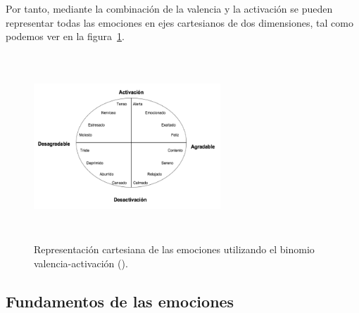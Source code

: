 Por tanto, mediante la combinación de la valencia y la activación se pueden representar todas las emociones en ejes cartesianos de dos dimensiones, tal como podemos ver en la figura~\ref{fig:valAct2}.

\begin{figure}[h]
    \centering
    \includegraphics[width=7cm, height=7cm]{Imagenes/valAct2}
    \caption[Representación cartesiana de las emociones utilizando el binomio valencia-activación extraída del texto de Hernández (\citeyear{hernandez2016clasificacion}).]{Representación cartesiana de las emociones utilizando el binomio valencia-activación (\citep{hernandez2016clasificacion}).}
    \label{fig:valAct2}
\end{figure}


\subsection{Fundamentos de las emociones}
